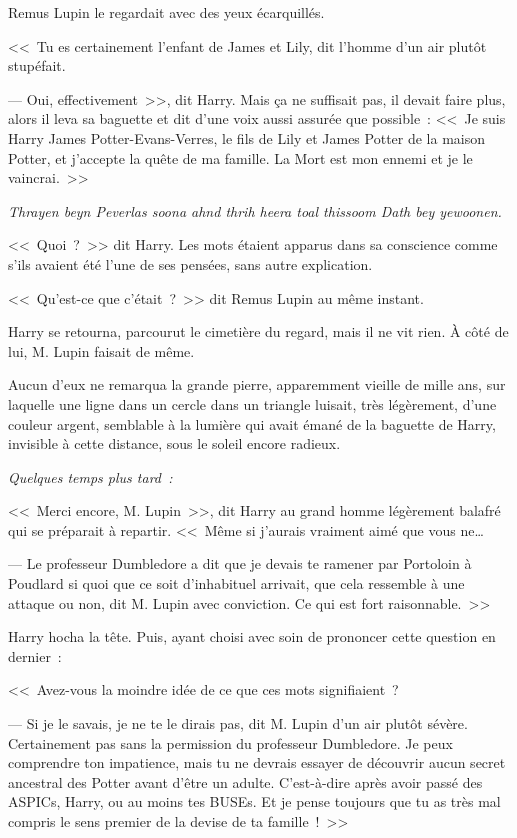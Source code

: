 Remus Lupin le regardait avec des yeux écarquillés.

<<~Tu es certainement l'enfant de James et Lily, dit l'homme d'un air plutôt stupéfait.

--- Oui, effectivement~>>, dit Harry. Mais ça ne suffisait pas, il devait faire plus, alors il leva sa baguette et dit d'une voix aussi assurée que possible~: <<~Je suis Harry James Potter-Evans-Verres, le fils de Lily et James Potter de la maison Potter, et j'accepte la quête de ma famille. La Mort est mon ennemi et je le vaincrai.~>>

\emph{Thrayen beyn Peverlas soona ahnd thrih heera toal thissoom Dath bey yewoonen.}

<<~Quoi~?~>> dit Harry. Les mots étaient apparus dans sa conscience comme s'ils avaient été l'une de ses pensées, sans autre explication.

<<~Qu'est-ce que c'était~?~>> dit Remus Lupin au même instant.

Harry se retourna, parcourut le cimetière du regard, mais il ne vit rien. À côté de lui, M. Lupin faisait de même.

Aucun d'eux ne remarqua la grande pierre, apparemment vieille de mille ans, sur laquelle une ligne dans un cercle dans un triangle luisait, très légèrement, d'une couleur argent, semblable à la lumière qui avait émané de la baguette de Harry, invisible à cette distance, sous le soleil encore radieux.

\later

\emph{Quelques temps plus tard~:}

<<~Merci encore, M. Lupin~>>, dit Harry au grand homme légèrement balafré qui se préparait à repartir. <<~Même si j'aurais vraiment aimé que vous ne…

--- Le professeur Dumbledore a dit que je devais te ramener par Portoloin à Poudlard si quoi que ce soit d'inhabituel arrivait, que cela ressemble à une attaque ou non, dit M. Lupin avec conviction. Ce qui est fort raisonnable.~>>

Harry hocha la tête. Puis, ayant choisi avec soin de prononcer cette question en dernier~:

<<~Avez-vous la moindre idée de ce que ces mots signifiaient~?

--- Si je le savais, je ne te le dirais pas, dit M. Lupin d'un air plutôt sévère. Certainement pas sans la permission du professeur Dumbledore. Je peux comprendre ton impatience, mais tu ne devrais essayer de découvrir aucun secret ancestral des Potter avant d'être un adulte. C'est-à-dire après avoir passé des ASPICs, Harry, ou au moins tes BUSEs. Et je pense toujours que tu as très mal compris le sens premier de la devise de ta famille~!~>>

